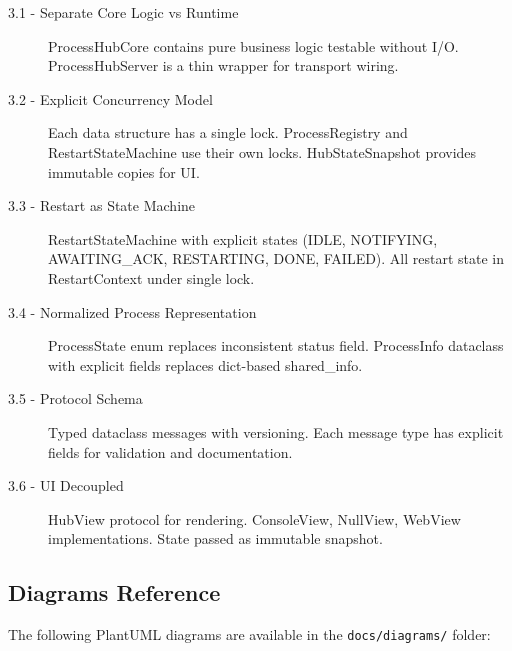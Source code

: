 \begin{description}
   \item[3.1 - Separate Core Logic vs Runtime]
        ProcessHubCore contains pure business logic testable without I/O.
        ProcessHubServer is a thin wrapper for transport wiring.

   \item[3.2 - Explicit Concurrency Model]
        Each data structure has a single lock. ProcessRegistry and RestartStateMachine
        use their own locks. HubStateSnapshot provides immutable copies for UI.

   \item[3.3 - Restart as State Machine]
        RestartStateMachine with explicit states (IDLE, NOTIFYING, AWAITING\_ACK,
        RESTARTING, DONE, FAILED). All restart state in RestartContext under single lock.

   \item[3.4 - Normalized Process Representation]
        ProcessState enum replaces inconsistent status field. ProcessInfo dataclass
        with explicit fields replaces dict-based shared\_info.

   \item[3.5 - Protocol Schema]
        Typed dataclass messages with versioning. Each message type has explicit
        fields for validation and documentation.

   \item[3.6 - UI Decoupled]
        HubView protocol for rendering. ConsoleView, NullView, WebView implementations.
        State passed as immutable snapshot.
\end{description}

\subsection{Diagrams Reference}

The following PlantUML diagrams are available in the \texttt{docs/diagrams/} folder:

